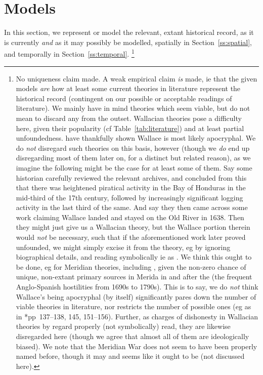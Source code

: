 \section{Models}
\label{s:models}
	In this section, we represent or model the relevant, extant historical record, as it is currently \emph{and} as it may possibly be modelled, spatially in Section~\ref{ss:spatial}, and temporally in Section~\ref{ss:temporal}.%
	\footnote{No uniqueness claim made. A weak empirical claim \emph{is} made, ie that the given models \emph{are} how at least some current theories in literature represent the historical record (contingent on our possible or acceptable readings of literature). We mainly have in mind theories which seem viable, but do not mean to discard any from the outset. Wallacian theories pose a difficulty here, given their popularity (cf Table~\ref{tab:literature}) and at least partial unfoundedness.  have thankfully shown Wallace is most likely apocryphal. We do \emph{not} disregard such theories on this basis, however (though we \emph{do} end up disregarding most of them later on, for a distinct but related reason), as we imagine the following might be the case for at least some of them. Say some historian carefully reviewed the relevant archives, and concluded from this that there was heightened piratical activity in the Bay of Honduras in the mid-third of the 17th century, followed by increasingly significant logging activity in the last third of the same. And say they then came across some work claiming Wallace landed and stayed on the Old River in 1638. Then they might just give us a Wallacian theory, but the Wallace portion therein would \emph{not} be necessary, such that if the aforementioned work later proved unfounded, we might simply excise it from the theory, eg by ignoring biographical details, and reading  symbolically ie as . We think this ought to be done, eg for Meridian theories, including , given the non-zero chance of unique, non-extant primary sources in Merida in and after the  (the frequent Anglo-Spanish hostilities from 1690s to 1790s). This is to say, we do \emph{not} think Wallace's being apocryphal (by itself) significantly pares down the number of viable theories in literature, nor restricts the number of possible ones (eg as in \cite{bul16}*{pp~137--138, 145, 151--156}). Further, as charges of dishonesty in Wallacian theories by  regard  properly (not symbolically) read, they are likewise disregarded here (though we agree that almost all of them are ideologically biased). We note that the Meridian War does not seem to have been properly named before, though it may and seems like it ought to be (not discussed here).} %
	
